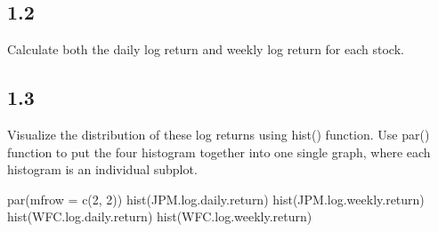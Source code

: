 \documentclass[
]{article}
\newenvironment{Shaded}{\begin{snugshade}}{\end{snugshade}}
\newcommand{\AttributeTok}[1]{\textcolor[rgb]{0.77,0.63,0.00}{#1}}
\newcommand{\DecValTok}[1]{\textcolor[rgb]{0.00,0.00,0.81}{#1}}
\newcommand{\FunctionTok}[1]{\textcolor[rgb]{0.00,0.00,0.00}{#1}}
\newcommand{\NormalTok}[1]{#1}
\newcommand{\OtherTok}[1]{\textcolor[rgb]{0.56,0.35,0.01}{#1}}
\newcommand{\SpecialCharTok}[1]{\textcolor[rgb]{0.00,0.00,0.00}{#1}}
\newcommand{\StringTok}[1]{\textcolor[rgb]{0.31,0.60,0.02}{#1}}
\begin{document}
\hypertarget{section-1}{%
\subsection{1.2}\label{section-1}}

Calculate both the daily log return and weekly log return for each
stock.

\begin{Shaded}
\end{Shaded}

\hypertarget{section-2}{%
\subsection{1.3}\label{section-2}}

Visualize the distribution of these log returns using hist() function.
Use par() function to put the four histogram together into one single
graph, where each histogram is an individual subplot.

\begin{Shaded}
\begin{Highlighting}[]
\FunctionTok{par}\NormalTok{(}\AttributeTok{mfrow =} \FunctionTok{c}\NormalTok{(}\DecValTok{2}\NormalTok{, }\DecValTok{2}\NormalTok{))}
\FunctionTok{hist}\NormalTok{(JPM.log.daily.return)}
\FunctionTok{hist}\NormalTok{(JPM.log.weekly.return)}
\FunctionTok{hist}\NormalTok{(WFC.log.daily.return)}
\FunctionTok{hist}\NormalTok{(WFC.log.weekly.return)}
\end{Highlighting}
\end{Shaded}
\end{document}
